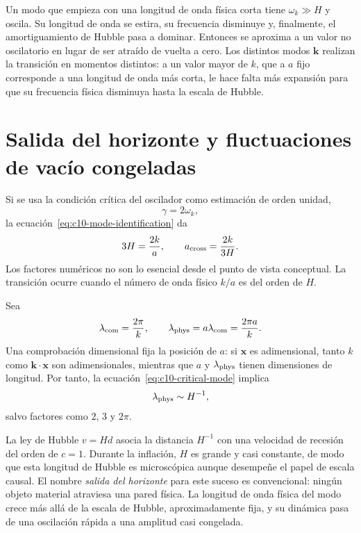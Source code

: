 Un modo que empieza con una longitud de onda física corta tiene \(\omega_k\gg H\) y oscila. Su longitud de onda se estira, su frecuencia disminuye y, finalmente, el amortiguamiento de Hubble pasa a dominar. Entonces se aproxima a un valor no oscilatorio en lugar de ser atraído de vuelta a cero. Los distintos modos \(\mathbf k\) realizan la transición en momentos distintos: a un valor mayor de \(k\), que a \(a\) fijo corresponde a una longitud de onda más corta, le hace falta más expansión para que su frecuencia física disminuya hasta la escala de Hubble.

\section{Salida del horizonte y fluctuaciones de vacío congeladas}

Si se usa la condición crítica del oscilador como estimación de orden unidad,
\[
\gamma=2\omega_k,
\]
la ecuación~\eqref{eq:c10-mode-identification} da
\begin{equation}
3H=\frac{2k}{a},
\qquad
a_{\rm cross}=\frac{2k}{3H}.
\label{eq:c10-critical-mode}
\end{equation}
Los factores numéricos no son lo esencial desde el punto de vista conceptual. La transición ocurre cuando el número de onda físico \(k/a\) es del orden de \(H\).

Sea
\[
\lambda_{\rm com}=\frac{2\pi}{k},
\qquad
\lambda_{\rm phys}=a\lambda_{\rm com}
=\frac{2\pi a}{k}.
\]
Una comprobación dimensional fija la posición de \(a\): si \(\mathbf x\) es adimensional, tanto \(k\) como \(\mathbf k\cdot\mathbf x\) son adimensionales, mientras que \(a\) y \(\lambda_{\rm phys}\) tienen dimensiones de longitud. Por tanto, la ecuación~\eqref{eq:c10-critical-mode} implica
\begin{equation}
\lambda_{\rm phys}\sim H^{-1},
\label{eq:c10-horizon-crossing}
\end{equation}
salvo factores como \(2\), \(3\) y \(2\pi\).

La ley de Hubble \(v=Hd\) asocia la distancia \(H^{-1}\) con una velocidad de recesión del orden de \(c=1\). Durante la inflación, \(H\) es grande y casi constante, de modo que esta longitud de Hubble es microscópica aunque desempeñe el papel de escala causal. El nombre \emph{salida del horizonte} para este suceso es convencional: ningún objeto material atraviesa una pared física. La longitud de onda física del modo crece más allá de la escala de Hubble, aproximadamente fija, y su dinámica pasa de una oscilación rápida a una amplitud casi congelada.

